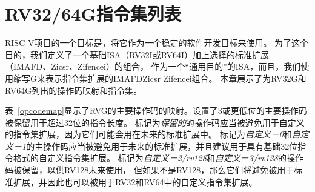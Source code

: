 \chapter{RV32/64G指令集列表}

RISC-V项目的一个目标是，将它作为一个稳定的软件开发目标来使用。
为了这个目的，我们定义了一个基础ISA（RV32I或RV64I）加上选择的标准扩展（IMAFD、Zicsr、Zifencei）的组合，
作为一个“通用目的”的ISA，而且，我们使用缩写G来表示指令集扩展的IMAFDZicsr Zifencei组合。
本章展示了为RV32G和RV64G列出的操作码映射和指令集。



表~\ref{opcodemap}显示了RVG的主要操作码的映射。设置了3或更低位的主要操作码被保留用于超过32位的指令长度。
标记为{\em 保留的}的操作码应当被避免用于自定义的指令集扩展，因为它们可能会用在未来的标准扩展中。
标记为{\em 自定义－0}和{\em 自定义－1}的主操作码应当被避免用于未来的标准扩展，并且建议用于具有基础32位指令格式的自定义指令集扩展。
标记为{\em 自定义－2/rv128}和{\em 自定义－3/rv128}的操作码被保留，以供RV128未来使用，
但如果不是RV128，那么它们将避免被用于标准扩展，并因此也可以被用于RV32和RV64中的自定义指令集扩展。

